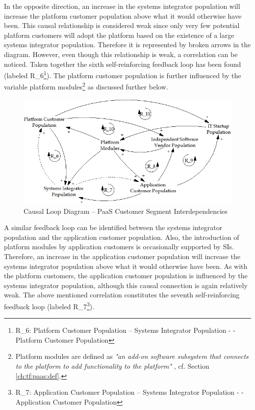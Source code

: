 In the opposite direction, an increase in the systems integrator population will increase the platform customer population above what it would otherwise have been. This causal relationship is considered weak since only very few potential platform customers will adopt the platform based on the existence of a large systems integrator population. Therefore it is represented by broken arrows in the diagram. However, even though this relationship is weak, a correlation can be noticed. Taken together the sixth self-reinforcing feedback loop has been found (labeled R\_6\footnote{R\_6: Platform Customer Population -- Systems Integrator Population - - Platform Customer Population}). The platform customer population is further influenced by the variable platform modules\footnote{Platform modules are defined as \textit{"an add-on software subsystem that connects to the platform to add functionality to the platform"} \citep[p. 676]{Tiwana2010}, cf. Section \ref{ch:tf:paas:def}.} as discussed further below.

\begin{figure}[tb]
	\centering
	\includegraphics[width=\textwidth]{gfx/cld_customerSegmentInterdependencies}
	\caption{Causal Loop Diagram -- PaaS Customer Segment Interdependencies}
	\label{fig:cld_csi}
\end{figure}

A similar feedback loop can be identified between the systems integrator population and the application customer population. Also, the introduction of platform modules by application customers is occasionally supported by \acp{SI}. Therefore, an increase in the application customer population will increase the systems integrator population above what it would otherwise have been. As with the platform customers, the application customer population is influenced by the systems integrator population, although this causal connection is again relatively weak. The above mentioned correlation constitutes the seventh self-reinforcing feedback loop (labeled R\_7\footnote{R\_7: Application Customer Population -- Systems Integrator Population - - Application Customer Population}).

